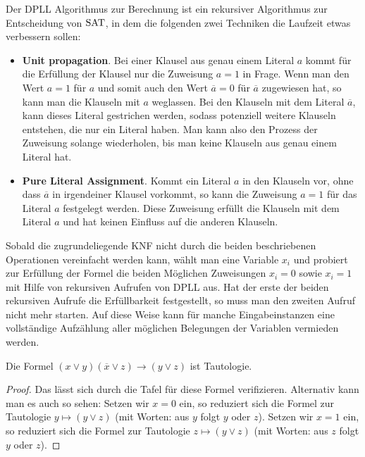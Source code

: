 \begin{bem}
	Der DPLL Algorithmus zur Berechnung ist ein rekursiver Algorithmus zur Entscheidung von $\operatorname{SAT}$, in dem die folgenden zwei Techniken die Laufzeit etwas verbessern sollen: 
	\begin{itemize}
		\item[] \textbf{Unit propagation}. Bei einer Klausel aus genau einem Literal $a$ kommt für die Erfüllung der Klausel nur die Zuweisung  $a=1$ in Frage. Wenn man den Wert $a=1$ für $a$ und somit auch den Wert $\overline{a}=0$ für $\overline{a}$ zugewiesen hat, so kann man die Klauseln mit $a$ weglassen. Bei den Klauseln mit dem Literal $\overline{a}$, kann dieses Literal gestrichen werden, sodass potenziell weitere Klauseln entstehen, die nur ein Literal haben. 
		Man kann also den Prozess der Zuweisung solange wiederholen, bis man keine Klauseln aus genau einem Literal hat. 
		\item[] \textbf{Pure Literal Assignment}. Kommt ein Literal $a$ in den Klauseln vor, ohne dass $\overline{a}$ in irgendeiner Klausel vorkommt, so kann die Zuweisung $a=1$ für das Literal $a$ festgelegt werden. Diese Zuweisung erfüllt die Klauseln mit dem Literal $a$ und hat keinen Einfluss auf die anderen Klauseln. 
	\end{itemize} 
	Sobald die zugrundeliegende KNF nicht durch die beiden beschriebenen Operationen vereinfacht werden kann, wählt man eine Variable $x_i$ und probiert zur Erfüllung der Formel  die beiden Möglichen Zuweisungen $x_i=0$ sowie $x_i=1$ mit Hilfe von rekursiven Aufrufen von DPLL aus. Hat der erste der beiden rekursiven Aufrufe die Erfüllbarkeit festgestellt, so muss man den zweiten Aufruf nicht mehr starten. Auf diese Weise kann für manche Eingabeinstanzen eine vollständige Aufzählung aller möglichen Belegungen der Variablen vermieden werden. 
\end{bem} 

\begin{lem}[Resolution] \label{resolution}
	Die Formel $(x \vee y) ( \overline{x} \vee z) \to (y \vee z)$ ist Tautologie. 
\end{lem} 
\begin{proof}
	Das lässt sich durch die Tafel für diese Formel verifizieren. Alternativ kann man es auch so sehen: 
	Setzen wir $x=0$ ein, so reduziert sich die Formel zur Tautologie $y \mapsto (y \vee z)$ (mit Worten: aus $y$ folgt $y$ oder $z$). Setzen wir $x=1$ ein, so reduziert sich die Formel zur Tautologie $z \mapsto (y \vee z)$ (mit Worten: aus $z$ folgt $y$ oder $z$). 
\end{proof} 

